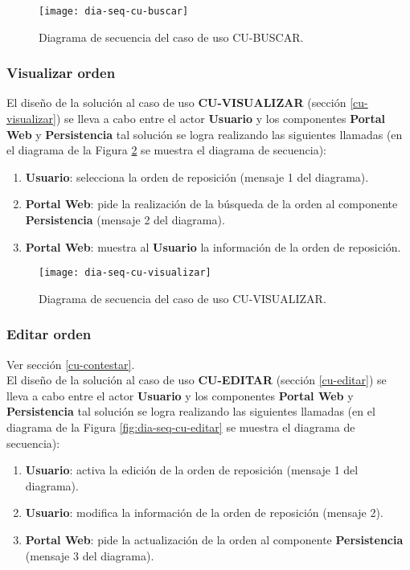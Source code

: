 \begin{figure}[h]
	\centering
	\texttt{[image: dia-seq-cu-buscar]}
	\caption{Diagrama de secuencia del caso de uso CU-BUSCAR.}
	\label{fig:dia-seq-cu-buscar}
\end{figure}

\subsubsection{Visualizar orden}
El diseño de la solución al caso de uso \textbf{CU-VISUALIZAR} (sección \ref{cu-visualizar}) se lleva a cabo entre el actor \textbf{Usuario} y los componentes \textbf{Portal Web} y \textbf{Persistencia} tal solución se logra realizando las siguientes llamadas (en el diagrama de la Figura \ref{fig:dia-seq-cu-visualizar} se muestra el diagrama de secuencia):
\begin{enumerate}
	\item \textbf{Usuario}: selecciona la orden de reposición (mensaje 1 del diagrama).
	\item \textbf{Portal Web}: pide la realización de la búsqueda de la orden al componente \textbf{Persistencia} (mensaje 2 del diagrama).
	\item \textbf{Portal Web}: muestra al \textbf{Usuario} la información de la orden de reposición.
\end{enumerate}

\begin{figure}[h]
	\centering
	\texttt{[image: dia-seq-cu-visualizar]}
	\caption{Diagrama de secuencia del caso de uso CU-VISUALIZAR.}
	\label{fig:dia-seq-cu-visualizar}
\end{figure}

\subsubsection{Editar orden}
Ver sección \ref{cu-contestar}.\\
El diseño de la solución al caso de uso \textbf{CU-EDITAR} (sección \ref{cu-editar}) se lleva a cabo entre el actor \textbf{Usuario} y los componentes \textbf{Portal Web} y \textbf{Persistencia} tal solución se logra realizando las siguientes llamadas (en el diagrama de la Figura \ref{fig:dia-seq-cu-editar} se muestra el diagrama de secuencia):
\begin{enumerate}
	\item \textbf{Usuario}: activa la edición de la orden de reposición (mensaje 1 del diagrama).
	\item \textbf{Usuario}: modifica la información de la orden de reposición (mensaje 2).
	\item \textbf{Portal Web}: pide la actualización de la orden al componente \textbf{Persistencia} (mensaje 3 del diagrama).
\end{enumerate}

